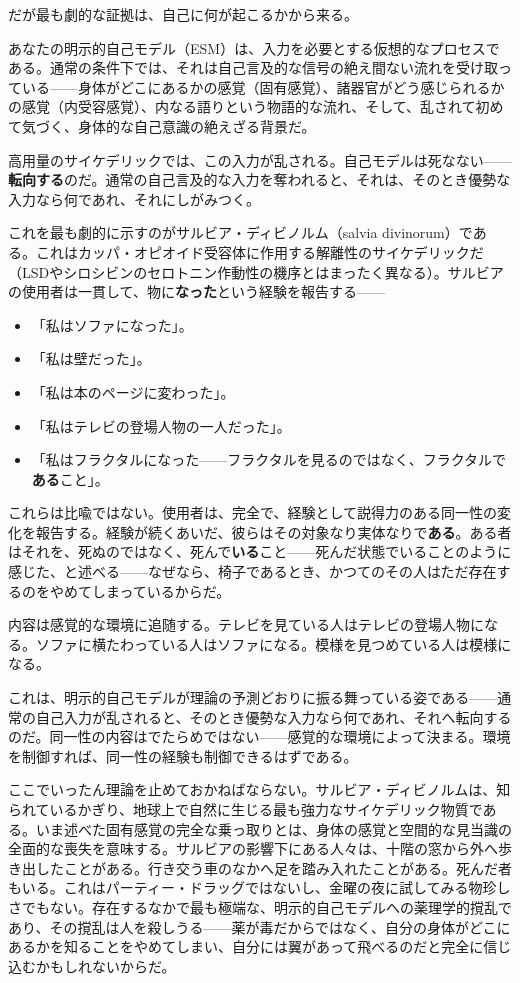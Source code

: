 \documentclass[11pt, twoside, openright]{book}
\begin{document}
だが最も劇的な証拠は、自己に何が起こるかから来る。

あなたの明示的自己モデル（ESM）は、入力を必要とする仮想的なプロセスである。通常の条件下では、それは自己言及的な信号の絶え間ない流れを受け取っている------身体がどこにあるかの感覚（固有感覚）、諸器官がどう感じられるかの感覚（内受容感覚）、内なる語りという物語的な流れ、そして、乱されて初めて気づく、身体的な自己意識の絶えざる背景だ。

高用量のサイケデリックでは、この入力が乱される。自己モデルは死なない------\textbf{転向する}のだ。通常の自己言及的な入力を奪われると、それは、そのとき優勢な入力なら何であれ、それにしがみつく。

これを最も劇的に示すのがサルビア・ディビノルム（salvia divinorum）である。これはカッパ・オピオイド受容体に作用する解離性のサイケデリックだ（LSDやシロシビンのセロトニン作動性の機序とはまったく異なる）。サルビアの使用者は一貫して、物に\textbf{なった}という経験を報告する------

\begin{itemize}
  \item 「私はソファになった」。
  \item 「私は壁だった」。
  \item 「私は本のページに変わった」。
  \item 「私はテレビの登場人物の一人だった」。
  \item 「私はフラクタルになった------フラクタルを見るのではなく、フラクタルで\textbf{ある}こと」。
\end{itemize}

これらは比喩ではない。使用者は、完全で、経験として説得力のある同一性の変化を報告する。経験が続くあいだ、彼らはその対象なり実体なりで\textbf{ある}。ある者はそれを、死ぬのではなく、死んで\textbf{いる}こと------死んだ状態でいることのように感じた、と述べる------なぜなら、椅子であるとき、かつてのその人はただ存在するのをやめてしまっているからだ。

内容は感覚的な環境に追随する。テレビを見ている人はテレビの登場人物になる。ソファに横たわっている人はソファになる。模様を見つめている人は模様になる。

これは、明示的自己モデルが理論の予測どおりに振る舞っている姿である------通常の自己入力が乱されると、そのとき優勢な入力なら何であれ、それへ転向するのだ。同一性の内容はでたらめではない------感覚的な環境によって決まる。環境を制御すれば、同一性の経験も制御できるはずである。

ここでいったん理論を止めておかねばならない。サルビア・ディビノルムは、知られているかぎり、地球上で自然に生じる最も強力なサイケデリック物質である。いま述べた固有感覚の完全な乗っ取りとは、身体の感覚と空間的な見当識の全面的な喪失を意味する。サルビアの影響下にある人々は、十階の窓から外へ歩き出したことがある。行き交う車のなかへ足を踏み入れたことがある。死んだ者もいる。これはパーティー・ドラッグではないし、金曜の夜に試してみる物珍しさでもない。存在するなかで最も極端な、明示的自己モデルへの薬理学的撹乱であり、その撹乱は人を殺しうる------薬が毒だからではなく、自分の身体がどこにあるかを知ることをやめてしまい、自分には翼があって飛べるのだと完全に信じ込むかもしれないからだ。
\end{document}

